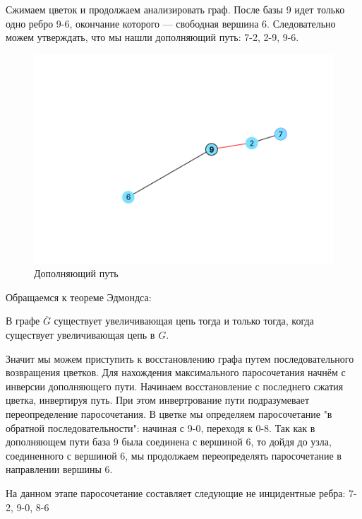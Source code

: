 \documentclass[14pt, a4paper]{extarticle}
\begin{document}
    Сжимаем цветок и продолжаем анализировать граф. После базы 9 идет только одно ребро 9-6, окончание которого --- свободная вершина 6. Следовательно можем утверждать, что мы нашли дополняющий путь: 7-2, 2-9, 9-6.

    \begin{figure}[h!]
        \centering
        \includegraphics[scale=0.3]{5.png}
        \caption{Дополняющий путь}
        \label{fig:my_label}
    \end{figure} 

    \pagebreak

    Обращаемся к теореме Эдмондса:
    
    В графе $\overline G$ существует увеличивающая цепь тогда и только тогда, когда существует увеличивающая цепь в $G$.

    Значит мы можем приступить к восстановлению графа путем последовательного возвращения цветков.
    Для нахождения максимального паросочетания начнём с инверсии дополняющего пути.
    Начинаем восстановление с последнего сжатия цветка, инвертируя путь. При этом инвертрование пути подразумевает переопределение паросочетания. В цветке мы определяем паросочетание "в обратной последовательности": начиная с 9-0, переходя к 0-8. Так как в дополняющем пути база 9 была соединена с вершиной 6, то дойдя до узла, соединенного с вершиной 6, мы продолжаем переопределять паросочетание в направлении вершины 6.

    На данном этапе паросочетание составляет следующие не инцидентные ребра:
    7-2, 9-0, 8-6

    \pagebreak
    
\end{document}

